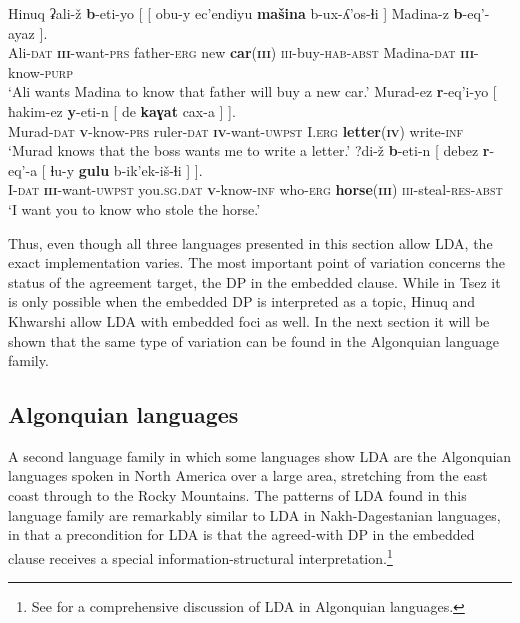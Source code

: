 \documentclass[output=paper
,modfonts
,nonflat]{langsci/langscibook}
\begin{document}
\begin{exe}
\ex Hinuq \citep[][633]{Forker2012} \label{ex:hinuq_cross-clausal}
	\xlist
	\ex \label{ex:hinuq_non-loc}
		\gll ʡali-\v{z} \textbf{b}-eti-yo [ [ obu-y ec'endiyu \textbf{ma\v{s}ina} b-ux-ʎ'os-ɬi ] Madina-z \textbf{b}-eq'-ayaz ].\\
			 Ali-\textsc{dat} \textbf{\textsc{iii}}-want-\textsc{prs} {} {} father-\textsc{erg} new \textbf{car}(\textbf{\textsc{iii}}) \textsc{iii}-buy-\textsc{hab}-\textsc{abst} {} Madina-\textsc{dat} \textbf{\textsc{iii}}-know-\textsc{purp}\\
		\glt `Ali wants Madina to know that father will buy a new car.'
	\ex \label{ex:hinuq_med}
		\gll Murad-ez \textbf{r}-eq'i-yo [ ħakim-ez \textbf{y}-eti-n [ de \textbf{kaɣat} cax-a ] ].\\
			 Murad-\textsc{dat} \textbf{\textsc{v}}-know-\textsc{prs} {} ruler-\textsc{dat} \textbf{\textsc{iv}}-want-\textsc{uwpst} {} I.\textsc{erg} \textbf{letter}(\textbf{\textsc{iv}}) write-\textsc{inf}\\
		\glt `Murad knows that the boss wants me to write a letter.'
	\ex \label{ex:hinuq_high}
		\gll ?di-\v{z} \textbf{b}-eti-n [ debez \textbf{r}-eq'-a [ ɬu-y \textbf{gulu} b-ik'ek-i\v{s}-ɬi ] ].\\
			 I-\textsc{dat} \textbf{\textsc{iii}}-want-\textsc{uwpst} {} you.\textsc{sg.dat} \textbf{\textsc{v}}-know-\textsc{inf} {} who-\textsc{erg} \textbf{horse}(\textbf{\textsc{iii}}) \textsc{iii}-steal-\textsc{res}-\textsc{abst}\\
		\glt `I want you to know who stole the horse.'
	\endxlist
\end{exe}
Thus, even though all three languages presented in this section allow LDA, the exact implementation varies. The most important point of variation concerns the status of the agreement target, the DP in the embedded clause. While in Tsez it is only possible when the embedded DP is interpreted as a topic, Hinuq and Khwarshi allow LDA with embedded foci as well. In the next section it will be shown that the same type of variation can be found in the Algonquian language family.

\subsection{Algonquian languages}

A second language family in which some languages show LDA are the Algonquian languages spoken in North America over a large area, stretching from the east coast through to the Rocky Mountains. The patterns of LDA found in this language family are remarkably similar to LDA in Nakh-Dagestanian languages, in that a precondition for LDA is that the agreed-with DP in the embedded clause receives a special information-structural interpretation.\footnote{See \citet{Fry_Hamilton2014} for a comprehensive discussion of LDA in Algonquian languages.}
\end{document}
